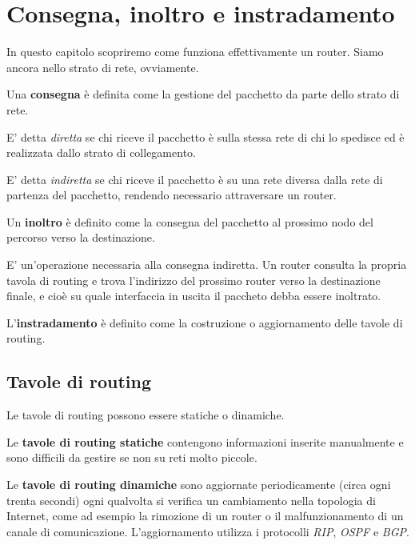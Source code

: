 \section{Consegna, inoltro e instradamento}

    In questo capitolo scopriremo come funziona effettivamente un router. Siamo ancora nello strato di rete, ovviamente.
    
    \vspace{3mm}
    
    Una \textbf{consegna} è definita come la gestione del pacchetto da parte dello strato di rete. 
    
    E' detta \textit{diretta} se chi riceve il pacchetto è sulla stessa rete di chi lo spedisce ed è realizzata dallo strato di collegamento. 
    
    E' detta \textit{indiretta} se chi riceve il pacchetto è su una rete diversa dalla rete di partenza del pacchetto, rendendo necessario attraversare un router.
    
    \vspace{3mm}
    
    Un \textbf{inoltro} è definito come la consegna del pacchetto al prossimo nodo del percorso verso la destinazione. 
    
    E' un'operazione necessaria alla consegna indiretta. Un router consulta la propria tavola di routing e trova l'indirizzo del prossimo router verso la destinazione finale, e cioè su quale interfaccia in uscita il paccheto debba essere inoltrato.
    
    \vspace{3mm}
    
    L'\textbf{instradamento} è definito come la costruzione o aggiornamento delle tavole di routing.
    
    \subsection{Tavole di routing}
    
        Le tavole di routing possono essere statiche o dinamiche.
        
        \vspace{3mm}
        
        Le \textbf{tavole di routing statiche} contengono informazioni inserite manualmente e sono difficili da gestire se non su reti molto piccole.
        
        Le \textbf{tavole di routing dinamiche} sono aggiornate periodicamente (circa ogni trenta secondi) ogni qualvolta si verifica un cambiamento nella topologia di Internet, come ad esempio la rimozione di un router o il malfunzionamento di un canale di comunicazione. L'aggiornamento utilizza i protocolli \textit{RIP}, \textit{OSPF} e \textit{BGP}.
        
